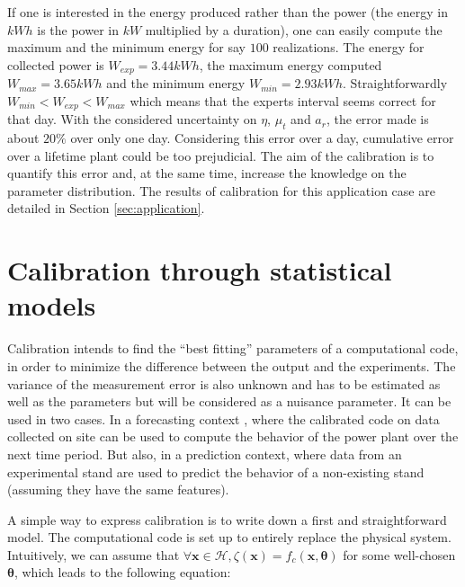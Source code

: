 \documentclass[soumission]{jsfds}
\edef\hc{\string: }
\begin{document}
If one is interested in the energy produced rather than the power (the energy in $kWh$ is the power in $kW$ multiplied by a duration), one can easily compute the maximum and the minimum energy for say $100$ realizations. The energy for collected power is $W_{exp}=3.44 kWh$, the maximum energy computed $W_{max}=3.65 kWh$ and the minimum energy $W_{min}=2.93 kWh$. Straightforwardly $W_{min} < W_{exp} < W_{max}$ which means that the experts interval seems correct for that day. With the considered uncertainty on $\eta$, $\mu_t$ and $a_r$, the error made is about $20\%$ over only one day. 
Considering this error over a day, cumulative error over a lifetime plant could be too prejudicial. The aim of the calibration is to quantify this error and, at the same time, increase the knowledge on the parameter distribution.
The results of calibration for this application case are detailed in Section \ref{sec:application}.


\section{Calibration through statistical models \label{sec:calibration}}

Calibration intends to find the ``best fitting'' parameters of a computational code, in order to minimize the difference between the output and the experiments. The variance of the measurement error is also unknown and has to be estimated as well as the parameters but will be considered as a nuisance parameter. It can be used in two cases. In a forecasting context \citep{craig2001}, where the calibrated code on data collected on site can be used to compute the behavior of the power plant over the next time period. But also, in a prediction context, where data from an experimental stand are used to predict the behavior of a non-existing stand (assuming they have the same features). \newline

A simple way to express calibration is to write down a first and straightforward model. The computational code is set up to entirely replace the physical system. Intuitively, we can assume that $\forall \boldsymbol{x} \in \mathcal{H}, \zeta(\boldsymbol{x})=f_c(\boldsymbol{x},\boldsymbol{\theta})$ for some well-chosen $\boldsymbol{\theta}$, which leads to the following equation\hc 
\end{document}
